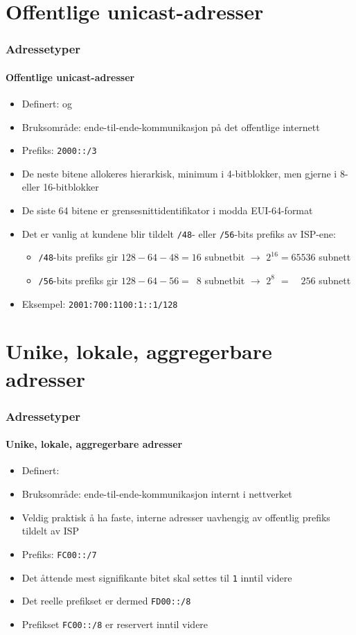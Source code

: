 \section{Offentlige unicast-adresser}
\begin{frame}%
  \frametitle{Adressetyper}
  \framesubtitle{Offentlige unicast-adresser}
  \pause
  \begin{itemize}[<+->]
  \item Definert:  og 
  \item Bruksområde: ende-til-ende-kommunikasjon på det offentlige internett
  \item Prefiks: \texttt{2000::/3}
  \item De neste bitene allokeres hierarkisk, minimum i 4-bitblokker,
    men gjerne i 8- eller 16-bitblokker
  \item De siste 64 bitene er grensesnittidentifikator i modda
    EUI-64-format
  \item Det er vanlig at kundene blir tildelt \texttt{/48}- eller
    \texttt{/56}-bits prefiks av ISP-ene:
    \begin{itemize}[<+->]
    \item \texttt{/48}-bits prefiks gir $128-64-48=16$ subnetbit $\to$ $2^{16}=65536$ subnett
    \item \texttt{/56}-bits prefiks gir $128-64-56=\phantom{1}8$ subnetbit $\to$ $2^{8\phantom{6}}=\phantom{65}256$ subnett
    \end{itemize}
  \item Eksempel: \texttt{2001:700:1100:1::1/128}
  \end{itemize}
\end{frame}

\section{Unike, lokale, aggregerbare adresser}
\begin{frame}%
  \frametitle{Adressetyper}
  \framesubtitle{Unike, lokale, aggregerbare adresser}
  \pause
  \begin{itemize}[<+->]
  \item Definert: 
  \item Bruksområde: ende-til-ende-kommunikasjon internt i nettverket
  \item Veldig praktisk å ha faste, interne adresser uavhengig av
    offentlig prefiks tildelt av ISP
  \item Prefiks: \texttt{FC00::/7}
  \item Det åttende mest signifikante bitet skal settes til \texttt{1}
    inntil videre
  \item Det reelle prefikset er dermed
    \texttt{\alert{FD}00::/\alert{8}}
  \item Prefikset \texttt{\alert{FC}00::/\alert{8}} er reservert
    inntil videre
  \end{itemize}
\end{frame}

